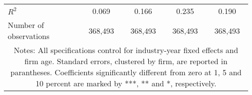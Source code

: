 \begin{tabular}{lcccc}
\\
	$R^2$ 
				& 0.069 
				& 0.166 
				& 0.235 
				& 0.190 \\
	Number of observations 
				& 368,493 
				& 368,493 
				& 368,493 
				& 368,493 \\
\hline \hline
\multicolumn{ 5 }{c}{\begin{minipage}{\textwidth}
\small Notes: All specifications control for industry-year fixed effects and firm age. Standard errors, clustered by firm, are reported in parantheses. Coefficients significantly different from zero at 1, 5 and 10 percent are marked by ***, ** and *, respectively.

  \end{minipage} } \\
\end{tabular}